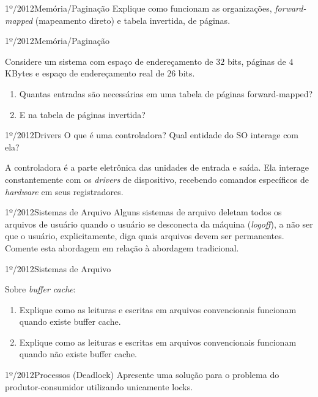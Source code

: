 \begin{exercicio}
  {1º/2012}{Memória/Paginação}
  {Explique como funcionam as organizações, \textit{forward-mapped} (mapeamento direto) e tabela invertida, de páginas.}
\end{exercicio}

\begin{exercicio}
  {1º/2012}{Memória/Paginação}
  {Considere um sistema com espaço de endereçamento de $32$ bits, páginas de $4$ KBytes e espaço de endereçamento real de $26$ bits.
  \begin{enumerate}[label=(\alph*)]
    \item Quantas entradas são necessárias em uma tabela de páginas forward-mapped?
    \item E na tabela de páginas invertida?
  \end{enumerate}}
\end{exercicio}

\begin{exercicio}
  {1º/2012}{Drivers}
  {O que é uma controladora? Qual entidade do SO interage com ela?}

  A controladora é a parte eletrônica das unidades de entrada e saída. Ela interage constantemente com os \textit{drivers} de dispositivo, recebendo comandos específicos de \textit{hardware} em seus registradores.
\end{exercicio}

\begin{exercicio}
  {1º/2012}{Sistemas de Arquivo}
  {Alguns sistemas de arquivo deletam todos os arquivos de usuário quando o usuário se desconecta da máquina (\textit{logoff}), a não ser que o usuário, explicitamente, diga quais arquivos devem ser permanentes. Comente esta abordagem em relação à abordagem tradicional.}
\end{exercicio}

\begin{exercicio}
  {1º/2012}{Sistemas de Arquivo}
  {Sobre \textit{buffer cache}:
  \begin{enumerate}[label=(\alph*)]
    \item Explique como as leituras e escritas em arquivos convencionais funcionam quando existe buffer cache.
    \item Explique como as leituras e escritas em arquivos convencionais funcionam quando não existe buffer cache.
  \end{enumerate}}
\end{exercicio}

\begin{exercicio}
  {1º/2012}{Processos (Deadlock)}
  {Apresente uma solução para o problema do produtor-consumidor utilizando unicamente locks.}
\end{exercicio}

